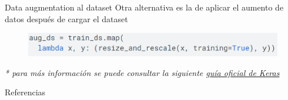 \begin{frame}{Data augmentation al dataset}
Otra alternativa es la de aplicar el aumento de datos \alert{después de cargar el dataset}

\begin{figure}
    \centering
    \includegraphics[width=\textwidth]{figures/Tema 3/DAKeras_2.png}
\end{figure}

\textit{* para más información se puede consultar la siguiente \textcolor{blue}{\href{https://www.tensorflow.org/tutorials/images/data_augmentation}{guía oficial de Keras}}}
\end{frame}


\begin{frame}[allowframebreaks]{Referencias}
    
    
\end{frame}


